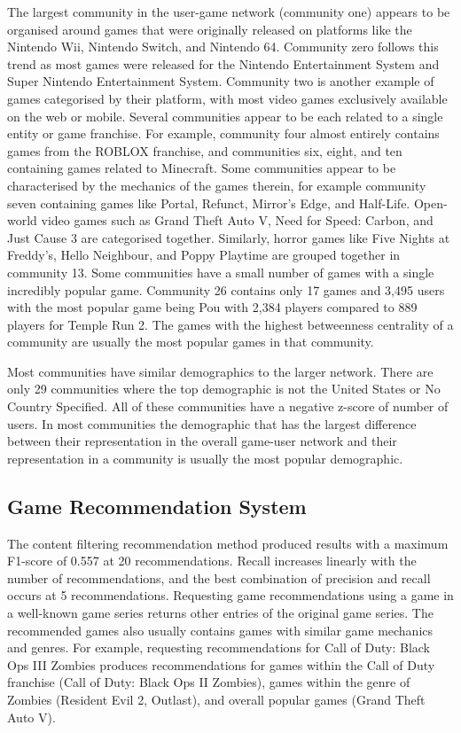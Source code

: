 The largest community in the user-game network (community one) appears to be organised around games that were originally released on platforms like the Nintendo Wii, Nintendo Switch, and Nintendo 64. Community zero follows this trend as most games were released for the Nintendo Entertainment System and Super Nintendo Entertainment System. Community two is another example of games categorised by their platform, with most video games exclusively available on the web or mobile. Several communities appear to be each related to a single entity or game franchise. For example, community four almost entirely contains games from the ROBLOX franchise, and communities six, eight, and ten containing games related to Minecraft. Some communities appear to be characterised by the mechanics of the games therein, for example community seven containing games like Portal, Refunct, Mirror's Edge, and Half-Life. Open-world video games such as Grand Theft Auto V, Need for Speed: Carbon, and Just Cause 3 are categorised together. Similarly, horror games like Five Nights at Freddy's, Hello Neighbour, and Poppy Playtime are grouped together in community 13. Some communities have a small number of games with a single incredibly popular game. Community 26 contains only 17 games and 3,495 users with the most popular game being Pou with 2,384 players compared to 889 players for Temple Run 2. The games with the highest betweenness centrality of a community are usually the most popular games in that community.


Most communities have similar demographics to the larger network. There are only 29 communities where the top demographic is not the United States or No Country Specified. All of these communities have a negative z-score of number of users. In most communities the demographic that has the largest difference between their representation in the overall game-user network and their representation in a community is usually the most popular demographic. 

\subsection{Game Recommendation System}

The content filtering recommendation method produced results with a maximum F1-score of 0.557 at 20 recommendations. Recall increases linearly with the number of recommendations, and the best combination of precision and recall occurs at 5 recommendations. Requesting game recommendations using a game in a well-known game series returns other entries of the original game series. The recommended games also usually contains games with similar game mechanics and genres. For example, requesting recommendations for Call of Duty: Black Ops III Zombies produces recommendations for games within the Call of Duty franchise (Call of Duty: Black Ops II Zombies), games within the genre of Zombies (Resident Evil 2, Outlast), and overall popular games (Grand Theft Auto V). 


